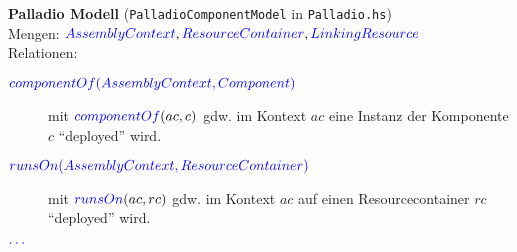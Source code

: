 \textbf{Palladio Modell} (\texttt{PalladioComponentModel} in \texttt{Palladio.hs})\\


Mengen: ${\color{blue}{AssemblyContext}}, {\color{blue}{ResourceContainer}}, {\color{blue}{LinkingResource}}$ \\

Relationen:
\begin{description}
  \item[${\color{blue}{componentOf(AssemblyContext, Component)}}$]
        mit ${\color{blue}{componentOf}}(ac, c)$ gdw. im Kontext $ac$ eine Instanz der Komponente
        $c$ \enquote{deployed} wird.
  \item[${\color{blue}{runsOn(AssemblyContext, ResourceContainer)}}$]
        mit ${\color{blue}{runsOn}}(ac, rc)$ gdw. im Kontext $ac$ auf einen Resourcecontainer $rc$
        \enquote{deployed} wird.
  \item[${\color{blue}{\ldots}}$]
\end{description} 
